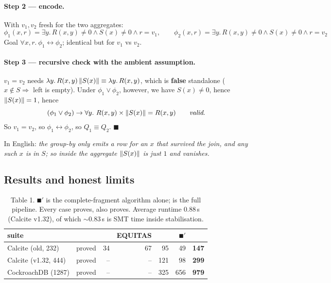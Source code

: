 \paragraph{Step 2 --- encode.} With $v_1,v_2$ fresh for the two aggregates:
\[
\phi_1(x,r)=\exists y.\,R(x,y)\neq0\wedge S(x)\neq0\wedge r=v_1,\qquad
\phi_2(x,r)=\exists y.\,R(x,y)\neq0\wedge S(x)\neq0\wedge r=v_2
\]
Goal $\forall x,r.\ \phi_1\leftrightarrow\phi_2$; identical but for $v_1$ vs $v_2$.

\paragraph{Step 3 --- recursive check with the ambient assumption.}
$v_1=v_2$ needs $\lambda y.\,R(x,y)\left\lVert S(x) \right\rVert\equiv\lambda y.\,R(x,y)$, which is \textbf{false}
standalone ($x\notin S \Rightarrow$ left is empty). Under $\phi_1\vee\phi_2$, however, we
have $S(x)\neq0$, hence $\left\lVert S(x) \right\rVert=1$, hence
\[
(\phi_1\vee\phi_2)\rightarrow\forall y.\ R(x,y)\times\sq{S(x)}=R(x,y)
\qquad\text{\emph{valid}.}
\]
So $v_1=v_2$, so $\phi_1\leftrightarrow\phi_2$, so $Q_1\equiv Q_2$. $\blacksquare$

\medskip
\noindent In English: \emph{the group-by only emits a row for an $x$ that survived the join,
and any such $x$ is in $S$; so inside the aggregate $\left\lVert S(x) \right\rVert$ is just $1$ and vanishes.}

\subsection{Results and honest limits}

\begin{table}[h]\centering\small
\begin{tabular}{@{}llrrrrr@{}}
\toprule
suite & & \udp{} & EQUITAS & \spes{} & $\QED'$ & \QED{}\\
\midrule
Calcite (old, 232)   & proved & 34 & 67 & 95 & 49 & \textbf{147}\\
Calcite (v1.32, 444) & proved & -- & -- & 121 & 98 & \textbf{299}\\
CockroachDB (1287)   & proved & -- & -- & 325 & 656 & \textbf{979}\\
\bottomrule
\end{tabular}
\caption{\cite{qed} Table 1. $\QED'$ is the complete-fragment algorithm alone; \QED{} is the
full pipeline. Every case \spes{} proves, \QED{} also proves. Average runtime
0.88\,s (Calcite v1.32), of which $\sim$0.83\,s is SMT time inside stabilisation.}
\end{table}

